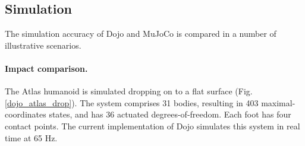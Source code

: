 \subsection{Simulation}

The simulation accuracy of Dojo and MuJoCo is compared in a number of illustrative  scenarios.

\paragraph{Impact comparison.} 

The Atlas humanoid is simulated dropping on to a flat surface (Fig. \ref{dojo_atlas_drop}). The system comprises 31 bodies, resulting in 403 maximal-coordinates states, and has 36 actuated degrees-of-freedom. Each foot has four contact points. The current implementation of Dojo simulates this system in real time at 65 Hz. 

